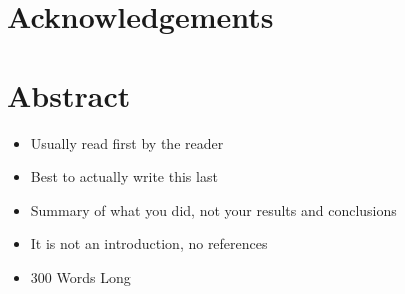 \section*{Acknowledgements}


\newpage

\section*{Abstract}

\begin{itemize}
    \item Usually read first by the reader
    \item Best to actually write this last
    \item Summary of what you did, not your results and conclusions
    \item It is not an introduction, no references
    \item 300 Words Long
\end{itemize}